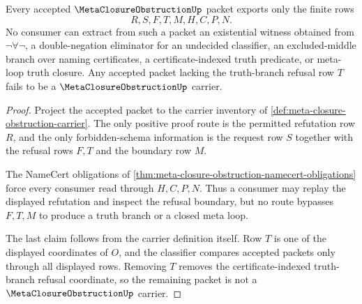 \begin{theorem}
\label{thm:meta-closure-obstruction-nonescape}
Every accepted $\MetaClosureObstructionUp$ packet exports only the finite rows
$$
R,S,F,T,M,H,C,P,N.
$$
No consumer can extract from such a packet an existential witness obtained from $\neg\forall\neg$, a double-negation eliminator for an undecided classifier, an excluded-middle branch over naming certificates, a certificate-indexed truth predicate, or meta-loop truth closure. Any accepted packet lacking the truth-branch refusal row $T$ fails to be a $\MetaClosureObstructionUp$ carrier.
\end{theorem}
\begin{proof}
Project the accepted packet to the carrier inventory of \autoref{def:meta-closure-obstruction-carrier}. The only positive proof route is the permitted refutation row $R$, and the only forbidden-schema information is the request row $S$ together with the refusal rows $F,T$ and the boundary row $M$.

The NameCert obligations of \autoref{thm:meta-closure-obstruction-namecert-obligations} force every consumer read through $H,C,P,N$. Thus a consumer may replay the displayed refutation and inspect the refusal boundary, but no route bypasses $F,T,M$ to produce a truth branch or a closed meta loop.

The last claim follows from the carrier definition itself. Row $T$ is one of the displayed coordinates of $O$, and the classifier compares accepted packets only through all displayed rows. Removing $T$ removes the certificate-indexed truth-branch refusal coordinate, so the remaining packet is not a $\MetaClosureObstructionUp$ carrier.
\end{proof}


